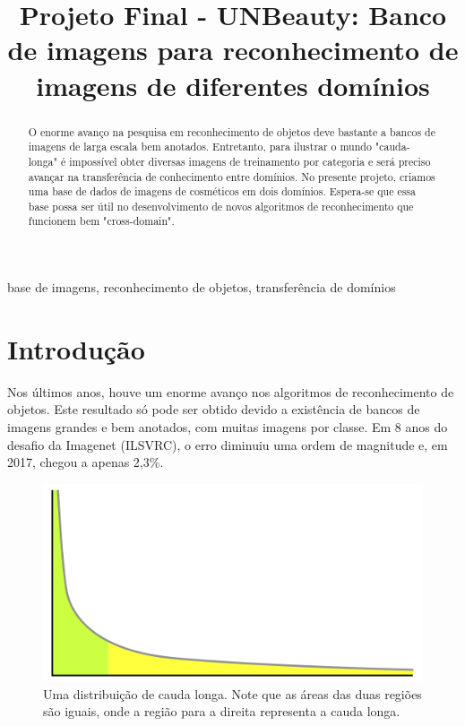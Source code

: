 \documentclass[conference]{IEEEtran}
\begin{document}
\title{Projeto Final - UNBeauty: Banco de imagens para reconhecimento de imagens de diferentes domínios}

\author{
}

\maketitle

\begin{abstract}
O enorme avanço na pesquisa em reconhecimento de objetos deve bastante a bancos de imagens de larga escala bem anotados. Entretanto, para ilustrar o mundo "cauda-longa" é impossível obter diversas imagens de treinamento por categoria e será preciso avançar na transferência de conhecimento entre domínios. No presente projeto, criamos uma base de dados de imagens de cosméticos em dois domínios.  Espera-se que essa base possa ser útil no desenvolvimento de novos algoritmos de reconhecimento que funcionem bem "cross-domain".
\end{abstract}

\begin{IEEEkeywords}
base de imagens, reconhecimento de objetos, transferência de domínios
\end{IEEEkeywords}

\section{Introdução}

Nos últimos anos, houve um enorme avanço nos algoritmos de reconhecimento de objetos\cite{horn}. Este resultado só pode ser obtido devido a existência de bancos de imagens grandes e bem anotados, com muitas imagens por classe\cite{fei, horn}. Em 8 anos do desafio da Imagenet (ILSVRC), o erro diminuiu uma ordem de magnitude\cite{fei} e, em 2017, chegou a apenas 2,3\%.


\begin{figure}[ht!]
\begin{center}
\includegraphics[width=.6\columnwidth]{long-tail.png}
\caption{Uma distribuição de cauda longa. Note que as áreas das duas regiões são iguais, onde a região para a direita representa a cauda longa.}\label{cauda-longa}
\end{center}
\end{figure}
\end{document}
